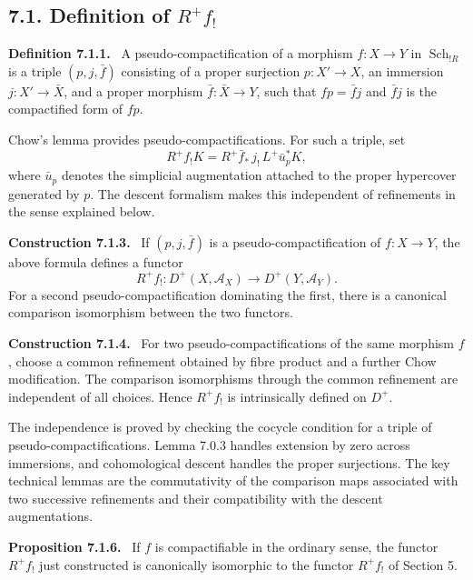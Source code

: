 \documentclass[12pt]{article}
\newcommand{\Aa}{\mathcal A}
\DeclareMathOperator{\Sch}{Sch}
\newenvironment{statement}[1]{\par\medskip\noindent\textbf{#1.}\ }{\par\medskip}
\begin{document}
\subsection*{7.1. Definition of \(R^+f_!\)}

\begin{statement}{Definition 7.1.1}
A pseudo-compactification of a morphism \(f:X\to Y\) in \(\Sch_{!R}\) is a triple \((p,j,\bar f)\) consisting of a proper surjection \(p:X'\to X\), an immersion \(j:X'\to\bar X\), and a proper morphism \(\bar f:\bar X\to Y\), such that \(f p=\bar f j\) and \(\bar f j\) is the compactified form of \(f p\).
\end{statement}

Chow's lemma provides pseudo-compactifications. For such a triple, set
\[
R^+f_!K=R^+\bar f_*\,j_!\,L^+\bar u_p^*K,
\]
where \(\bar u_p\) denotes the simplicial augmentation attached to the proper hypercover generated by \(p\). The descent formalism makes this independent of refinements in the sense explained below.

\begin{statement}{Construction 7.1.3}
If \((p,j,\bar f)\) is a pseudo-compactification of \(f:X\to Y\), the above formula defines a functor
\[
R^+f_!:D^+(X,\Aa_X)\longrightarrow D^+(Y,\Aa_Y).
\]
For a second pseudo-compactification dominating the first, there is a canonical comparison isomorphism between the two functors.
\end{statement}

\begin{statement}{Construction 7.1.4}
For two pseudo-compactifications of the same morphism \(f\), choose a common refinement obtained by fibre product and a further Chow modification. The comparison isomorphisms through the common refinement are independent of all choices. Hence \(R^+f_!\) is intrinsically defined on \(D^+\).
\end{statement}

The independence is proved by checking the cocycle condition for a triple of pseudo-compactifications. Lemma 7.0.3 handles extension by zero across immersions, and cohomological descent handles the proper surjections. The key technical lemmas are the commutativity of the comparison maps associated with two successive refinements and their compatibility with the descent augmentations.

\begin{statement}{Proposition 7.1.6}
If \(f\) is compactifiable in the ordinary sense, the functor \(R^+f_!\) just constructed is canonically isomorphic to the functor \(R^+f_!\) of Section 5.
\end{statement}
\end{document}
